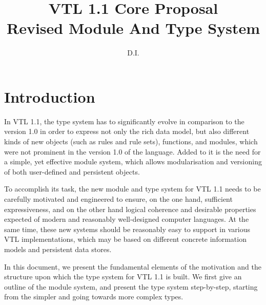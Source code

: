 \documentclass[droidmono,libertine,twoside,user,unofficial]{ecarticle}
\title{VTL 1.1 Core Proposal\\Revised Module And Type System}
\author{D.I.}
\begin{document}
\maketitle


\section{Introduction}
\label{sec:introduction}

In VTL 1.1, the type system has to significantly evolve in comparison
to the version 1.0 in order to express not only the rich data model,
but also different kinds of new objects (such as rules and rule sets),
functions, and modules, which were not prominent in the version 1.0 of
the language.  Added to it is the need for a simple, yet effective
module system, which allows modularisation and versioning of both
user-defined and persistent objects.

To accomplish its task, the new module and type system for VTL 1.1
needs to be carefully motivated and engineered to ensure, on the one
hand, sufficient expressiveness, and on the other hand logical
coherence and desirable properties expected of modern and reasonably
well-designed computer languages.  At the same time, these new systems
should be reasonably easy to support in various VTL implementations,
which may be based on different concrete information models and
persistent data stores.

In this document, we present the fundamental elements of the
motivation and the structure upon which the type system for VTL 1.1 is
built.  We first give an outline of the module system, and present the
type system step-by-step, starting from the simpler and going towards
more complex types.

\end{document}
